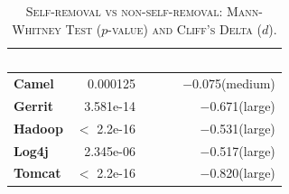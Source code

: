


\begin{table}[t]
	\begin{center}
		\caption{\textsc{Self-removal vs non-self-removal: Mann-Whitney Test ($p$-value) and Cliff's Delta ($d$)}.}
		\label{tbl:statistic}
		\begin{tabular}{l| rrr}
			\toprule
			\textbf{\thead{Project}} & \textbf{\thead{$p$-value}}&~~~ & \textbf{\thead{$d$}}\\ 
			\midrule
			\textbf{Camel }   &  0.000125& ~~~ &  $-$0.075(medium)  \\  
			\textbf{Gerrit}   &  3.581e-14& ~~~ &  $-$0.671(large)  \\  
			\textbf{Hadoop}   &  $<$ 2.2e-16& ~~~ &  $-$0.531(large)  \\  
			\textbf{Log4j}   &  2.345e-06 & ~~~ &  $-$0.517(large)  \\  
			\textbf{Tomcat}   &  $<$ 2.2e-16  & ~~~ &  $-$0.820(large) \\  
			\bottomrule
		\end{tabular}
	\end{center} 
	\vspace{-0.1in}   
\end{table}











